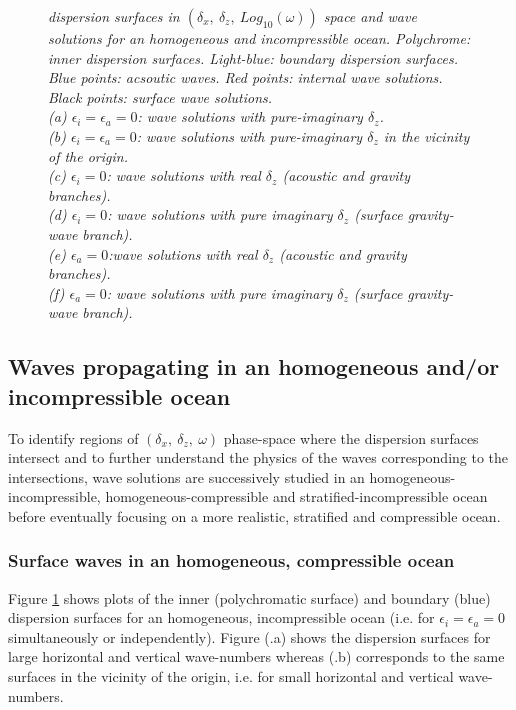 \documentclass[a4paper,11pt]{article}
\begin{document}
\begin{figure}[!h]
\begin{subfigure}{0.36\linewidth}
		\caption{}
	\end{subfigure}
	\caption{\textit{dispersion surfaces in $(\delta_x,\ \delta_z,\ Log_{10}(\omega))$ space and wave solutions for an homogeneous and incompressible ocean. Polychrome: inner dispersion surfaces. Light-blue: boundary dispersion surfaces. Blue points: acsoutic waves. Red points: internal wave solutions. Black points: surface wave solutions.\\
	(a) $\epsilon_i=\epsilon_a=0$: wave solutions with pure-imaginary $\delta_z$.\\
	(b)  $\epsilon_i=\epsilon_a=0$: wave solutions with pure-imaginary $\delta_z$ in the vicinity of the origin.\\
	(c) $\epsilon_i=0$: wave solutions with real $\delta_z$ (acoustic and gravity branches).\\ 
	(d) $\epsilon_i=0$: wave solutions with pure imaginary $\delta_z$ (surface gravity-wave branch).\\ 
	(e) $\epsilon_a=0$:wave solutions with real $\delta_z$ (acoustic and gravity branches).\\ 
	(f) $\epsilon_a=0$: wave solutions with pure imaginary $\delta_z$ (surface gravity-wave branch).\\
	}}
	\label{FigFullHomogeneous}
\end{figure}

\subsection{Waves propagating in an homogeneous and/or incompressible ocean}
\label{SubSectionHomogeneousIncomp}
To identify regions of $(\delta_x,\ \delta_z,\ \omega)$ phase-space where the dispersion surfaces intersect and to further understand the physics of the waves corresponding to the intersections, wave solutions are successively studied in an homogeneous-incompressible, homogeneous-compressible and stratified-incompressible ocean before eventually focusing on a more realistic, stratified and compressible ocean.\\

\subsubsection{Surface waves in an homogeneous, compressible ocean}
Figure \ref{FigFullHomogeneous} shows plots of the inner (polychromatic surface) and boundary (blue) dispersion surfaces for an homogeneous, incompressible ocean (i.e. for $\epsilon_i=\epsilon_a= 0$ simultaneously or independently). Figure (.a) shows the dispersion surfaces for large horizontal and vertical wave-numbers whereas (.b) corresponds to the same surfaces in the vicinity of the origin, i.e. for small horizontal and vertical wave-numbers.
\end{document}
